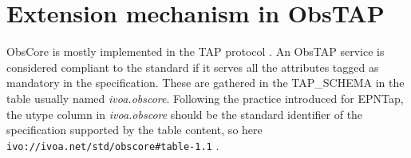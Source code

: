 \documentclass[11pt,a4paper]{ivoa}
\begin{document}
%

 \section{Extension mechanism in ObsTAP }
 \label{sec:comext}
 ObsCore is mostly implemented in the TAP protocol \citep{2019ivoa.spec.0927D}.
 An ObsTAP service is considered compliant to the standard if it serves all the attributes tagged as mandatory in the specification.
 These are gathered in the TAP\_SCHEMA in the table usually named \emph{ivoa.obscore}.
 Following the practice introduced  for EPNTap,  the utype column in \emph{ivoa.obscore} should be the standard identifier of the specification supported by the table content, so here \\ \texttt{ivo://ivoa.net/std/obscore\#table-1.1} .
\end{document}
